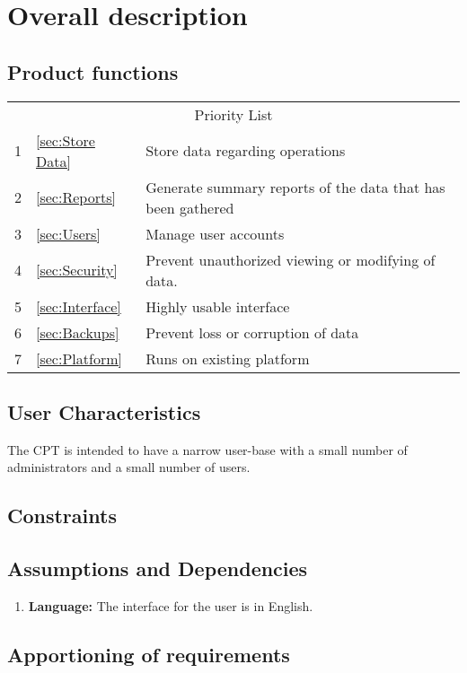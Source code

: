 \documentclass[12pt]{article}
\begin{document}
\section{Overall description}
\subsection{Product functions}

\begin{tabular}{l | l p{5.25in}}
\multicolumn{3}{c}{Priority List}\\
1 &\ref{sec:Store Data}			& Store data regarding operations \\
2 &\ref{sec:Reports}			& Generate summary reports of the data that has been gathered\\
3 &\ref{sec:Users}				& Manage user accounts\\
4 &\ref{sec:Security}			& Prevent unauthorized viewing or modifying of data. \\
5 &\ref{sec:Interface}			& Highly usable interface\\ 
6 &\ref{sec:Backups}			& Prevent loss or corruption of data\\
7 &\ref{sec:Platform}			& Runs on existing platform\\
\end{tabular}

\subsection{User Characteristics}
The CPT is intended to have a narrow user-base with a small number of administrators and a small number of users.

\subsection{Constraints}


\subsection{Assumptions and Dependencies}
\begin{enumerate}
\item \textbf{Language:} The interface for the user is in English.
\end{enumerate}

\subsection{Apportioning of requirements}
\end{document}
